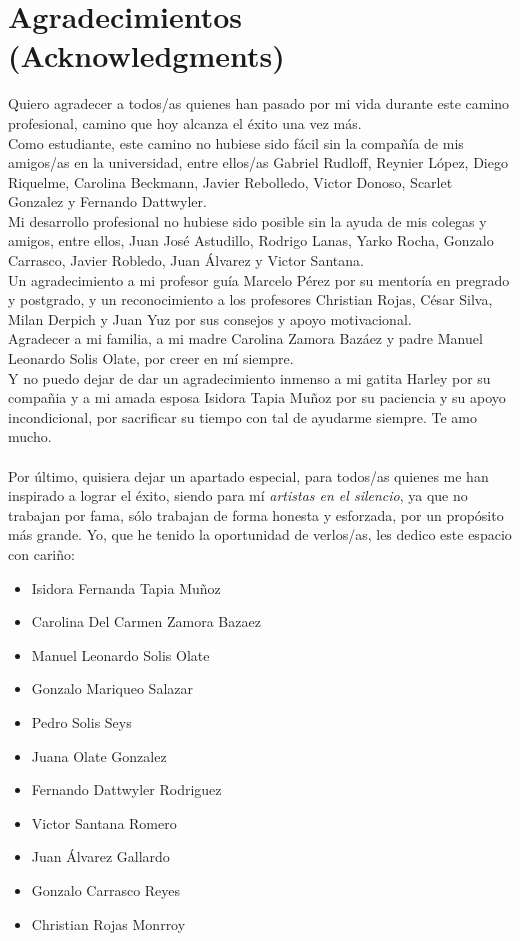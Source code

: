 
\chapter{Agradecimientos (Acknowledgments)}


Quiero agradecer a todos/as quienes han pasado por mi vida durante este camino profesional, camino que hoy alcanza el éxito una vez más. \\
Como estudiante, este camino no hubiese sido fácil sin la compañía de mis amigos/as en la universidad, entre ellos/as Gabriel Rudloff, Reynier López, Diego Riquelme, Carolina Beckmann, Javier Rebolledo, Victor Donoso, Scarlet Gonzalez y Fernando Dattwyler.\\ 
Mi desarrollo profesional no hubiese sido posible sin la ayuda de mis colegas y amigos, entre ellos, Juan José Astudillo, Rodrigo Lanas, Yarko Rocha, Gonzalo Carrasco, Javier Robledo, Juan Álvarez y Victor Santana.
\\
Un agradecimiento a mi profesor guía Marcelo Pérez por su mentoría en pregrado y postgrado, y un reconocimiento a los profesores Christian Rojas, César Silva, Milan Derpich y Juan Yuz por sus consejos y apoyo motivacional.\\ 
Agradecer a mi familia, a mi madre Carolina Zamora Bazáez y padre Manuel Leonardo Solis Olate, por creer en mí siempre.\\ Y no puedo dejar de dar un agradecimiento inmenso a mi gatita Harley por su compañia y a mi amada esposa Isidora Tapia Muñoz por su paciencia y su apoyo incondicional, por sacrificar su tiempo con tal de ayudarme siempre. Te amo mucho.\\\\
Por último, quisiera dejar un apartado especial, para todos/as quienes me han inspirado a lograr el éxito, siendo para mí \textit{artistas en el silencio}, ya que no trabajan por fama, sólo trabajan de forma honesta y esforzada, por un propósito más grande. Yo, que he tenido la oportunidad de verlos/as, les dedico este espacio con cariño:

\begin{itemize}
\item Isidora Fernanda Tapia Muñoz
\item Carolina Del Carmen Zamora Bazaez
\item Manuel Leonardo Solis Olate
\item Gonzalo Mariqueo Salazar
\item Pedro Solis Seys
\item Juana Olate Gonzalez
\item Fernando Dattwyler Rodriguez
\item Victor Santana Romero
\item Juan Álvarez Gallardo
\item Gonzalo Carrasco Reyes
\item Christian Rojas Monrroy
\end{itemize}